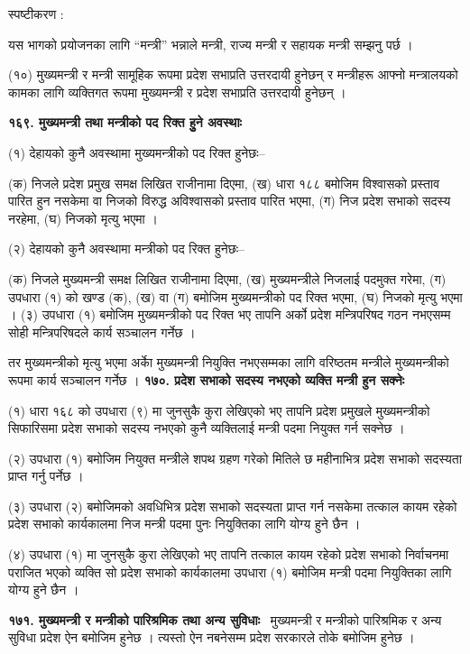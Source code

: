 स्पष्टीकरण :

यस भागको प्रयोजनका लागि “मन्त्री” भन्नाले मन्त्री, राज्य मन्त्री र सहायक मन्त्री सम्झनु पर्छ ।

(१०) मुख्यमन्त्री र मन्त्री सामूहिक रूपमा प्रदेश सभाप्रति उत्तरदायी हुनेछन् र मन्त्रीहरू आफ्नो मन्त्रालयको कामका लागि व्यक्तिगत रूपमा मुख्यमन्त्री र प्रदेश सभाप्रति उत्तरदायी हुनेछन् ।

\textbf{१६९. मुख्यमन्त्री तथा मन्त्रीको पद रिक्त हुुने अवस्थाः}

(१) देहायको कुनै अवस्थामा मुख्यमन्त्रीको पद रिक्त हुनेछः–

(क) निजले प्रदेश प्रमुख समक्ष लिखित राजीनामा दिएमा,
(ख) धारा १८८ बमोजिम विश्वासको प्रस्ताव पारित हुन नसकेमा वा निजको विरुद्ध अविश्वासको प्रस्ताव पारित भएमा,
(ग) निज प्रदेश सभाको सदस्य नरहेमा,
(घ) निजको मृत्यु भएमा ।

(२) देहायको कुनै अवस्थामा मन्त्रीको पद रिक्त हुनेछः–

(क) निजले मुख्यमन्त्री समक्ष लिखित राजीनामा दिएमा,
(ख) मुख्यमन्त्रीले निजलाई पदमुक्त गरेमा,
(ग) उपधारा (१) को खण्ड (क), (ख) वा (ग) बमोजिम मुख्यमन्त्रीको पद रिक्त भएमा,
(घ) निजको मृत्यु भएमा ।
(३) उपधारा (१) बमोजिम मुख्यमन्त्रीको पद रिक्त भए तापनि अर्को प्रदेश मन्त्रिपरिषद गठन नभएसम्म सोही मन्त्रिपरिषदले कार्य सञ्चालन गर्नेछ ।

तर मुख्यमन्त्रीको मृत्यु भएमा अर्काे मुख्यमन्त्री नियुक्ति नभएसम्मका लागि वरिष्ठतम मन्त्रीले मुख्यमन्त्रीको रूपमा कार्य सञ्चालन गर्नेछ ।
\textbf{१७०. प्रदेश सभाको सदस्य नभएको व्यक्ति मन्त्री हुन सक्नेः}

(१) धारा १६८ को उपधारा (९) मा जुनसुकै कुरा लेखिएको भए तापनि प्रदेश प्रमुखले मुख्यमन्त्रीको सिफारिसमा प्रदेश सभाको सदस्य नभएको कुनै व्यक्तिलाई मन्त्री पदमा नियुक्त गर्न सक्नेछ ।

(२) उपधारा (१) बमोजिम नियुक्त मन्त्रीले शपथ ग्रहण गरेको मितिले छ महीनाभित्र प्रदेश सभाको सदस्यता प्राप्त गर्नु पर्नेछ ।

(३) उपधारा (२) बमोजिमको अवधिभित्र प्रदेश सभाको सदस्यता प्राप्त गर्न नसकेमा तत्काल कायम रहेको प्रदेश सभाको कार्यकालमा निज मन्त्री पदमा पुनः नियुक्तिका लागि योग्य हुने छैन ।

(४) उपधारा (१) मा जुनसुकै कुरा लेखिएको भए तापनि तत्काल कायम रहेको प्रदेश सभाको निर्वाचनमा पराजित भएको व्यक्ति सो प्रदेश
सभाको कार्यकालमा उपधारा (१) बमोजिम मन्त्री पदमा नियुक्तिका लागि योग्य हुने छैन ।

\textbf{१७१. मुख्यमन्त्री र मन्त्रीको पारिश्रमिक तथा अन्य सुविधाः}  मुख्यमन्त्री र मन्त्रीको पारिश्रमिक र अन्य सुविधा प्रदेश ऐन बमोजिम हुनेछ । त्यस्तो ऐन नबनेसम्म प्रदेश सरकारले तोके बमोजिम हुनेछ ।

